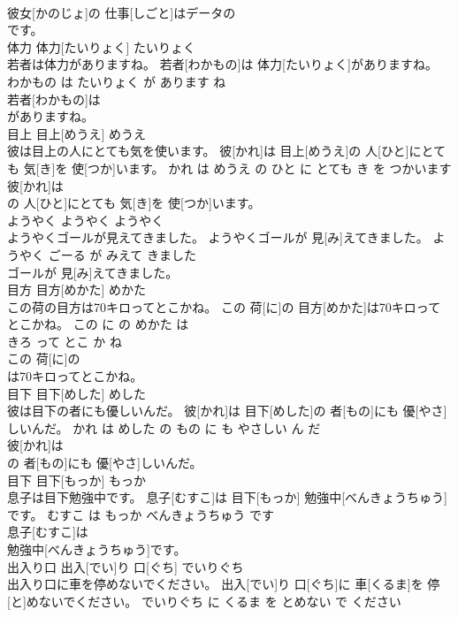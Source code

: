 \documentclass[8pt]{extreport}
\begin{document}
\begin{CJK}{UTF8}{min}
\\	彼女[かのじょ]の 仕事[しごと]はデータの
\\	です。			
\\	体力	体力[たいりょく]	たいりょく	
\\	若者は体力がありますね。	若者[わかもの]は 体力[たいりょく]がありますね。	わかもの は たいりょく が あります ね	
\\	若者[わかもの]は
\\	がありますね。			
\\	目上	目上[めうえ]	めうえ	
\\	彼は目上の人にとても気を使います。	彼[かれ]は 目上[めうえ]の 人[ひと]にとても 気[き]を 使[つか]います。	かれ は めうえ の ひと に とても き を つかいます	
\\	彼[かれ]は
\\	の 人[ひと]にとても 気[き]を 使[つか]います。			
\\	ようやく	ようやく	ようやく	
\\	ようやくゴールが見えてきました。	ようやくゴールが 見[み]えてきました。	ようやく ごーる が みえて きました	
\\	ゴールが 見[み]えてきました。			
\\	目方	目方[めかた]	めかた	
\\	この荷の目方は70キロってとこかね。	この 荷[に]の 目方[めかた]は70キロってとこかね。	この に の めかた は 
\\	きろ って とこ か ね	
\\	この 荷[に]の
\\	は70キロってとこかね。			
\\	目下	目下[めした]	めした	
\\	彼は目下の者にも優しいんだ。	彼[かれ]は 目下[めした]の 者[もの]にも 優[やさ]しいんだ。	かれ は めした の もの に も やさしい ん だ	
\\	彼[かれ]は
\\	の 者[もの]にも 優[やさ]しいんだ。			
\\	目下	目下[もっか]	もっか	
\\	息子は目下勉強中です。	息子[むすこ]は 目下[もっか] 勉強中[べんきょうちゅう]です。	むすこ は もっか べんきょうちゅう です	
\\	息子[むすこ]は
\\	勉強中[べんきょうちゅう]です。			
\\	出入り口	出入[でい]り 口[ぐち]	でいりぐち	
\\	出入り口に車を停めないでください。	出入[でい]り 口[ぐち]に 車[くるま]を 停[と]めないでください。	でいりぐち に くるま を とめない で ください	

\end{CJK}
\end{document}
